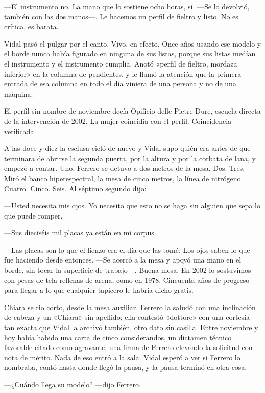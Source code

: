 ---El instrumento no. La mano que lo sostiene ocho horas, sí. ---Se lo devolvió, también con las dos manos---. Le hacemos un perfil de fieltro y listo. No es crítica, es barata.

Vidal pasó el pulgar por el canto. Vivo, en efecto. Once años usando ese modelo y el borde nunca había figurado en ninguna de sus listas, porque sus listas medían el instrumento y el instrumento cumplía. Anotó «perfil de fieltro, mordaza inferior» en la columna de pendientes, y le llamó la atención que la primera entrada de esa columna en todo el día viniera de una persona y no de una máquina.

El perfil sin nombre de noviembre decía Opificio delle Pietre Dure, escuela directa de la intervención de 2002. La mujer coincidía con el perfil. Coincidencia verificada.

A las doce y diez la esclusa cicló de nuevo y Vidal supo quién era antes de que terminara de abrirse la segunda puerta, por la altura y por la corbata de lana, y empezó a contar. Uno. Ferrero se detuvo a dos metros de la mesa. Dos. Tres. Miró el banco hiperespectral, la mesa de cinco metros, la línea de nitrógeno. Cuatro. Cinco. Seis. Al séptimo segundo dijo:

---Usted necesita mis ojos. Yo necesito que esto no se haga sin alguien que sepa lo que puede romper.

---Sus dieciséis mil placas ya están en mi corpus.

---Las placas son lo que el lienzo era el día que las tomé. Los ojos saben lo que fue haciendo desde entonces. ---Se acercó a la mesa y apoyó una mano en el borde, sin tocar la superficie de trabajo---. Buena mesa. En 2002 lo sostuvimos con pesas de tela rellenas de arena, como en 1978. Cincuenta años de progreso para llegar a lo que cualquier tapicero le habría dicho gratis.

Chiara se rio corto, desde la mesa auxiliar. Ferrero la saludó con una inclinación de cabeza y un «Chiara» sin apellido; ella contestó «dottore» con una cortesía tan exacta que Vidal la archivó también, otro dato sin casilla. Entre noviembre y hoy había habido una carta de cinco considerandos, un dictamen técnico favorable citado como agravante, una firma de Ferrero elevando la solicitud con nota de mérito. Nada de eso entró a la sala. Vidal esperó a ver si Ferrero lo nombraba, contó hasta donde llegó la pausa, y la pausa terminó en otra cosa.

---¿Cuándo llega su modelo? ---dijo Ferrero.

